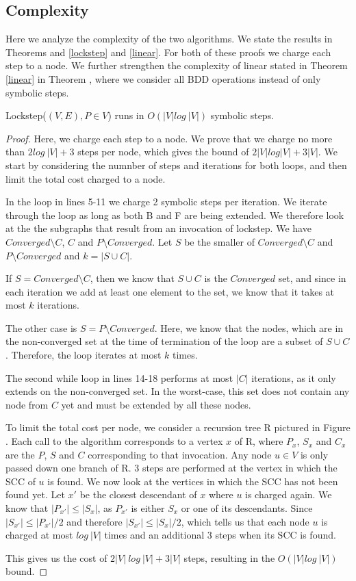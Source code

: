 \documentclass[../master/master.tex]{subfiles}
\begin{document}
\subsection{Complexity}
Here we analyze the complexity of the two algorithms. We state the results in Theorems  and \ref{lockstep} and \ref{linear}. For both of these proofs we charge each step to a node. We further strengthen the complexity of linear stated in Theorem \ref{linear} in Theorem \label{linear-strengthened}, where we consider all BDD operations instead of only symbolic steps.

\begin{theorem}\label{lockstep} Lockstep($(V, E), P\in V$) runs in $O(|V|log\ |V|)$ symbolic steps.
\end{theorem}
\begin{proof}
  Here, we charge each step to a node. We prove that we charge no more than $2 log\ |V|+3$ steps per node, which gives the bound of $2|V|log|V|+3|V|$. We start by considering the numnber of steps and iterations for both loops, and then limit the total cost charged to a node.

  In the loop in lines 5-11 we charge 2 symbolic steps per iteration. We iterate through the loop as long as both B and F are being extended. We therefore look at the the subgraphs that result from an invocation of lockstep. We have $Converged\setminus C$, $C$ and $P\setminus Converged$. Let $S$ be the smaller of $Converged\setminus C$ and $P\setminus Converged$ and $k = |S\cup C|$.

  If $S = Converged\setminus C$, then we know that $S\cup C$ is the $Converged$ set, and since in each iteration we add at least one element to the set, we know that it takes at most $k$ iterations.

  The other case is $S=P\setminus Converged$. Here, we know that the nodes, which are in the non-converged set at the time of termination of the loop are a subset of $S\cup C$. Therefore, the loop iterates at most $k$ times.

  The second while loop in lines 14-18 performs at most $|C|$ iterations, as it only extends on the non-converged set. In the worst-case, this set does not contain any node from $C$ yet and must be extended by all these nodes.

  To limit the total cost per node, we consider a recursion tree R pictured in Figure . Each call to the algorithm corresponds to a vertex $x$ of R, where $P_x$, $S_x$ and $C_x$ are the $P$, $S$ and $C$ corresponding to that invocation. Any node $u \in V$ is only passed down one branch of R. 3 steps are performed at the vertex in which the SCC of $u$ is found. We now look at the vertices in which the SCC has not been found yet. Let $x'$ be the closest descendant of $x$ where $u$ is charged again. We know that $|P_{x'}|\leq |S_x|$, as $P_{x'}$ is either $S_x$ or one of its descendants. Since $|S_{x'}|\leq |P_{x'}|/2$ and therefore $|S_{x'}|\leq |S_{x}|/2$, which tells us that each node $u$ is charged at most $log\ |V|$ times and an additional 3 steps when its SCC is found.

  This gives us the cost of $2|V|\ log\ |V| + 3|V|$ steps, resulting in the $O(|V|log\ |V|)$ bound.
\end{proof}
\end{document}
